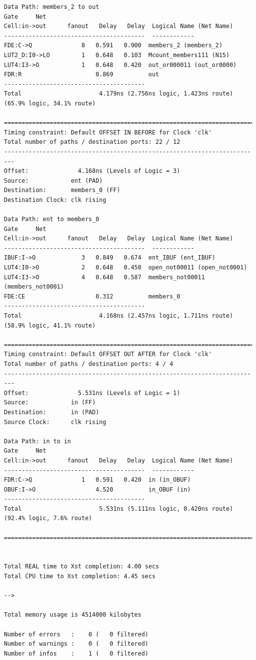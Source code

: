 \documentclass[fleqn]{article}
\begin{document}
\begin{latin}
\begin{lstlisting}[basicstyle=\tiny]
Data Path: members_2 to out
Gate     Net
Cell:in->out      fanout   Delay   Delay  Logical Name (Net Name)
----------------------------------------  ------------
FDE:C->Q              8   0.591   0.900  members_2 (members_2)
LUT2_D:I0->LO         1   0.648   0.103  Mcount_members111 (N15)
LUT4:I3->O            1   0.648   0.420  out_or000011 (out_or0000)
FDR:R                     0.869          out
----------------------------------------
Total                      4.179ns (2.756ns logic, 1.423ns route)
(65.9% logic, 34.1% route)

=========================================================================
Timing constraint: Default OFFSET IN BEFORE for Clock 'clk'
Total number of paths / destination ports: 22 / 12
-------------------------------------------------------------------------
Offset:              4.168ns (Levels of Logic = 3)
Source:            ent (PAD)
Destination:       members_0 (FF)
Destination Clock: clk rising

Data Path: ent to members_0
Gate     Net
Cell:in->out      fanout   Delay   Delay  Logical Name (Net Name)
----------------------------------------  ------------
IBUF:I->O             3   0.849   0.674  ent_IBUF (ent_IBUF)
LUT4:I0->O            2   0.648   0.450  open_not00011 (open_not0001)
LUT4:I3->O            4   0.648   0.587  members_not00011 (members_not0001)
FDE:CE                    0.312          members_0
----------------------------------------
Total                      4.168ns (2.457ns logic, 1.711ns route)
(58.9% logic, 41.1% route)

=========================================================================
Timing constraint: Default OFFSET OUT AFTER for Clock 'clk'
Total number of paths / destination ports: 4 / 4
-------------------------------------------------------------------------
Offset:              5.531ns (Levels of Logic = 1)
Source:            in (FF)
Destination:       in (PAD)
Source Clock:      clk rising

Data Path: in to in
Gate     Net
Cell:in->out      fanout   Delay   Delay  Logical Name (Net Name)
----------------------------------------  ------------
FDR:C->Q              1   0.591   0.420  in (in_OBUF)
OBUF:I->O                 4.520          in_OBUF (in)
----------------------------------------
Total                      5.531ns (5.111ns logic, 0.420ns route)
(92.4% logic, 7.6% route)

=========================================================================


Total REAL time to Xst completion: 4.00 secs
Total CPU time to Xst completion: 4.45 secs

--> 

Total memory usage is 4514000 kilobytes

Number of errors   :    0 (   0 filtered)
Number of warnings :    0 (   0 filtered)
Number of infos    :    1 (   0 filtered)
\end{lstlisting}
\end{latin}
\end{document}
